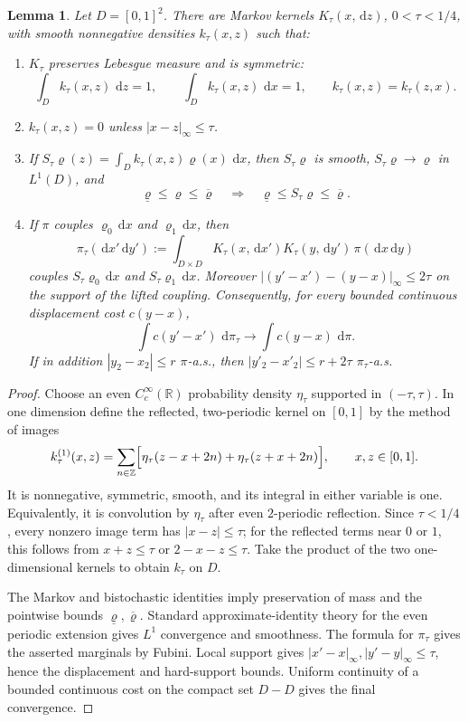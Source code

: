 \documentclass[11pt]{article}
\newtheorem{lemma}[lemma]{Lemma}
\theoremstyle{definition}
\theoremstyle{remark}
\numberwithin{equation}{section}
\newcommand{\R}{\mathbb R}
\newcommand{\dd}{\,\mathrm d}
\begin{document}
\begin{lemma}
\label{red:lem:local-smoothing}
Let $D=[0,1]^2$.  There are Markov kernels $K_\tau(x,\dd z)$,
$0<\tau<1/4$, with smooth nonnegative densities $k_\tau(x,z)$ such that:
\begin{enumerate}[label=\textup{(\roman*)}]
\item $K_\tau$ preserves Lebesgue measure and is symmetric:
\[
 \int_D k_\tau(x,z)\,\dd z=1,
 \qquad
 \int_D k_\tau(x,z)\,\dd x=1,
 \qquad
 k_\tau(x,z)=k_\tau(z,x).
\]
\item $k_\tau(x,z)=0$ unless $|x-z|_\infty\le\tau$.
\item If $S_\tau\varrho(z)=\int_D k_\tau(x,z)\varrho(x)\,\dd x$, then
$S_\tau\varrho$ is smooth, $S_\tau\varrho\to\varrho$ in $L^1(D)$, and
\[
 \underline\varrho\le\varrho\le\overline\varrho \quad\Longrightarrow\quad
 \underline\varrho\le S_\tau\varrho\le\overline\varrho.
\]
\item If $\pi$ couples $\varrho_0\dd x$ and $\varrho_1\dd x$, then
\[
 \pi_\tau(\dd x'\dd y')
 :=\int_{D\times D}K_\tau(x,\dd x')K_\tau(y,\dd y')\,\pi(\dd x\dd y)
\]
couples $S_\tau\varrho_0\dd x$ and $S_\tau\varrho_1\dd x$.  Moreover
$|(y'-x')-(y-x)|_\infty\le2\tau$ on the support of the lifted coupling.
Consequently, for every bounded continuous displacement cost $c(y-x)$,
\[
 \int c(y'-x')\,\dd\pi_\tau\longrightarrow
 \int c(y-x)\,\dd\pi.
\]
If in addition $|y_2-x_2|\le r$ $\pi$-a.s., then
$|y'_2-x'_2|\le r+2\tau$ $\pi_\tau$-a.s.
\end{enumerate}
\end{lemma}

\begin{proof}
Choose an even $C_c^\infty(\R)$ probability density $\eta_\tau$ supported
in $(-\tau,\tau)$.  In one dimension define the reflected, two-periodic
kernel on $[0,1]$ by the method of images
\[
 k^{(1)}_\tau(x,z)
 =\sum_{n\in\mathbb Z}\Bigl[
   \eta_\tau(z-x+2n)+\eta_\tau(z+x+2n)
 \Bigr],
 \qquad x,z\in[0,1].
\]
It is nonnegative, symmetric, smooth, and its integral in either variable is
one.  Equivalently, it is convolution by $\eta_\tau$ after even
$2$-periodic reflection.  Since $\tau<1/4$, every nonzero image term has
$|x-z|\le\tau$; for the reflected terms near $0$ or $1$, this follows from
$x+z\le\tau$ or $2-x-z\le\tau$.  Take the product of the two
one-dimensional kernels to obtain $k_\tau$ on $D$.

The Markov and bistochastic identities imply preservation of mass and the
pointwise bounds $\underline\varrho,\overline\varrho$.  Standard approximate-identity theory for the even
periodic extension gives $L^1$ convergence and smoothness.  The formula for
$\pi_\tau$ gives the asserted marginals by Fubini.  Local support gives
$|x'-x|_\infty,|y'-y|_\infty\le\tau$, hence the displacement and hard-support
bounds.  Uniform continuity of a bounded continuous cost on the compact set
$D-D$ gives the final convergence.
\end{proof}
\end{document}
